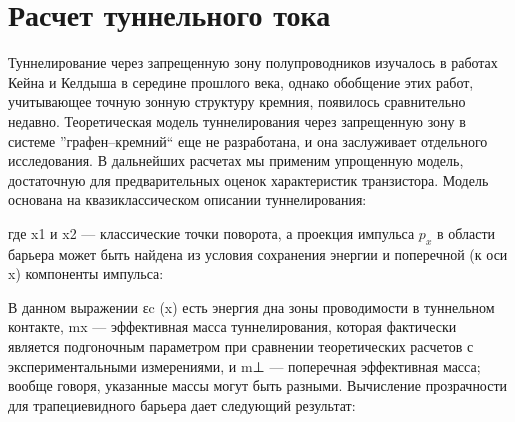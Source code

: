 \documentclass[a4paper,12pt]{article} %
\begin{document}
\section{Расчет туннельного тока}
\noindent Туннелирование через запрещенную зону полупроводников изучалось в работах Кейна и Келдыша в середине прошлого века, однако обобщение этих работ, учитывающее точную зонную структуру кремния, появилось сравнительно недавно. Теоретическая модель туннелирования через запрещенную зону в системе ”графен–кремний“ еще не разработана, и она заслуживает отдельного исследования. В дальнейших расчетах мы применим упрощенную модель, достаточную для предварительных оценок характеристик транзистора. Модель основана на квазиклассическом описании туннелирования:
\begin{figure}[h!]
\end{figure}
\noindent где x1 и x2 — классические точки поворота, а проекция импульса $p_x$ в области барьера может быть найдена из условия сохранения энергии и поперечной (к оси x) компоненты импульса:
\begin{figure}[h!]
\end{figure}
\noindent В данном выражении εc (x) есть энергия дна зоны проводимости в туннельном контакте, mx — эффективная масса туннелирования, которая фактически является подгоночным параметром при сравнении теоретических расчетов с экспериментальными измерениями, и m⊥ — поперечная эффективная масса; вообще говоря, указанные массы могут быть разными. Вычисление прозрачности для трапециевидного барьера дает следующий результат:
\begin{figure}[h!]
\end{figure}
\end{document}
